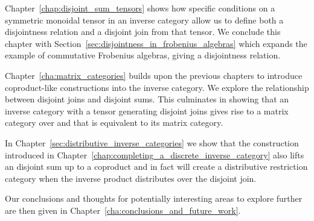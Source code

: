 Chapter~\ref{chap:disjoint_sum_tensors} shows how specific conditions on a symmetric monoidal
tensor in an inverse category allow us to define both a disjointness relation and a disjoint join
from that tensor. We conclude this chapter with Section~\ref{sec:disjointness_in_frobenius_algebras}
which expands the example of commutative Frobenius algebras, giving a disjointness relation.

Chapter~\ref{cha:matrix_categories} builds upon the previous chapters to introduce
coproduct-like constructions into the inverse
category. We explore the relationship between disjoint joins and
disjoint sums. This culminates in showing that an inverse category \X with a tensor generating disjoint
joins gives rise to a matrix category over \X and that \X is equivalent to its matrix
category.

In Chapter~\ref{sec:distributive_inverse_categories} we show that the
construction introduced in Chapter~\ref{chap:completing_a_discrete_inverse_category} also lifts an
disjoint sum up to a coproduct and in fact will create a distributive restriction category when the
inverse product distributes over the disjoint join.

Our conclusions and thoughts for potentially interesting areas to explore further are then given in
Chapter~\ref{cha:conclusions_and_future_work}.



